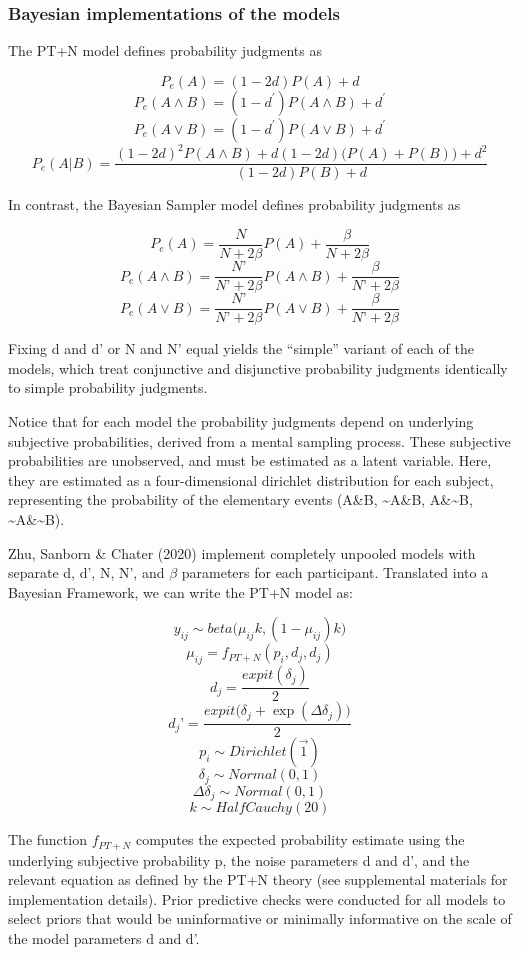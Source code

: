 \documentclass{article}
\begin{document}
\hypertarget{bayesian-implementations-of-the-models}{%
\subsubsection{Bayesian implementations of the
models}\label{bayesian-implementations-of-the-models}}

The PT+N model defines probability judgments as

\[P_{e}(A) = (1-2d)P(A) + d\]
\[P_e(A\land B) = (1-d^\prime)P(A \land B)+d^\prime\]
\[P_e(A\lor B) = (1-d^\prime)P(A \lor B)+d^\prime\]
\[P_e(A|B) = \frac{(1-2d)^2P(A \land B) + d(1-2d)\big(P(A)+P(B)\big)+d^2}{(1-2d)P(B)+d}\]

In contrast, the Bayesian Sampler model defines probability judgments as

\[P_{e}(A) = \frac{N}{N + 2 \beta}P(A) + \frac{\beta}{N+2 \beta}\]
\[P_{e}(A \land B) = \frac{N’}{N’ + 2 \beta}P(A \land B) + \frac{\beta}{N’+2 \beta}\]
\[P_{e}(A \lor B) = \frac{N’}{N’ + 2 \beta}P(A \lor B) + \frac{\beta}{N’+2 \beta}\]

Fixing d and d' or N and N' equal yields the ``simple'' variant of each
of the models, which treat conjunctive and disjunctive probability
judgments identically to simple probability judgments.

Notice that for each model the probability judgments depend on
underlying subjective probabilities, derived from a mental sampling
process. These subjective probabilities are unobserved, and must be
estimated as a latent variable. Here, they are estimated as a
four-dimensional dirichlet distribution for each subject, representing
the probability of the elementary events (A\&B, \textasciitilde A\&B,
A\&\textasciitilde B, \textasciitilde A\&\textasciitilde B).

Zhu, Sanborn \& Chater (2020) implement completely unpooled models with
separate d, d', N, N', and \(\beta\) parameters for each participant.
Translated into a Bayesian Framework, we can write the PT+N model as:

\[y_{ij} \sim beta\big(\mu_{ij} k, (1-\mu_{ij})k\big)\]
\[\mu_{ij} = f_{PT+N}(p_i, d_j, d_j) \]
\[ d_j = \frac{expit(\delta_j)}{2}\]
\[ d_j’ = \frac{expit\big(\delta_j + \exp(\Delta\delta_j)\big)}{2}\]
\[ p_i \sim Dirichlet(\overrightarrow{1})\]
\[ \delta_j \sim Normal(0,1)\] \[ \Delta\delta_j \sim Normal(0,1)\]
\[ k \sim HalfCauchy(20)\]

The function \(f_{PT+N}\) computes the expected probability estimate
using the underlying subjective probability p, the noise parameters d
and d', and the relevant equation as defined by the PT+N theory (see
supplemental materials for implementation details). Prior predictive
checks were conducted for all models to select priors that would be
uninformative or minimally informative on the scale of the model
parameters d and d'.
\end{document}
